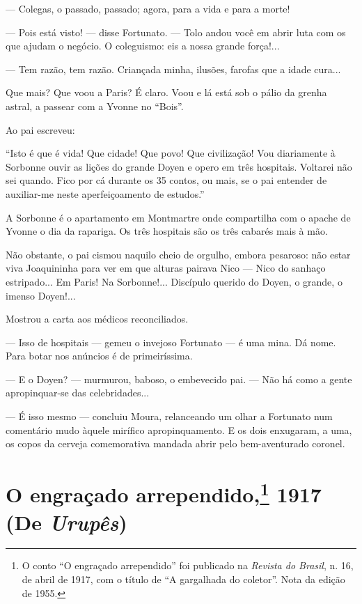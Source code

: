 --- Colegas, o passado, passado; agora, para a vida e para a morte!

--- Pois está visto! --- disse Fortunato. --- Tolo andou você em abrir
luta com os que ajudam o negócio. O coleguismo: eis a nossa grande
força!...

--- Tem razão, tem razão. Criançada minha, ilusões, farofas que a idade
cura...

Que mais? Que voou a Paris? É claro. Voou e lá está sob o pálio da
grenha astral, a passear com a Yvonne no ``Bois''.

Ao pai escreveu:

``Isto é que é vida! Que cidade! Que povo! Que civilização! Vou
diariamente à Sorbonne ouvir as lições do grande Doyen e opero em três
hospitais. Voltarei não sei quando. Fico por cá durante os 35 contos, ou
mais, se o pai entender de auxiliar-me neste aperfeiçoamento de
estudos.''

A Sorbonne é o apartamento em Montmartre onde compartilha com o apache
de Yvonne o dia da rapariga. Os três hospitais são os três cabarés mais
à mão.

Não obstante, o pai cismou naquilo cheio de orgulho, embora pesaroso:
não estar viva Joaquininha para ver em que alturas pairava Nico --- Nico
do sanhaço estripado... Em Paris! Na Sorbonne!... Discípulo querido do
Doyen, o grande, o imenso Doyen!...

Mostrou a carta aos médicos reconciliados.

--- Isso de hospitais --- gemeu o invejoso Fortunato --- é uma mina. Dá
nome. Para botar nos anúncios é de primeiríssima.

--- E o Doyen? --- murmurou, baboso, o embevecido pai. --- Não há como a
gente apropinquar-se das celebridades...

--- É isso mesmo --- concluiu Moura, relanceando um olhar a Fortunato
num comentário mudo àquele mirífico apropinquamento. E os dois
enxugaram, a uma, os copos da cerveja comemorativa mandada abrir pelo
bem-aventurado coronel.

\chapter[O engraçado arrependido, 1917 (De \emph{Urupês})]{O engraçado arrependido,\footnote{O conto ``O
  engraçado arrependido'' foi publicado na \emph{Revista do Brasil}, n.
  16, de abril de 1917, com o título de ``A gargalhada do coletor''.
  Nota da edição de 1955.} 1917 (De \emph{Urupês})}

